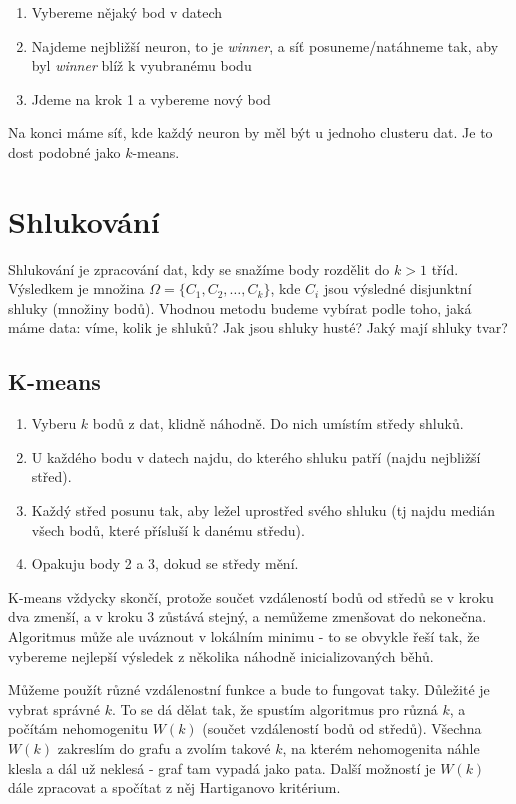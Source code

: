 \documentclass[10pt,a4paper]{article}
\begin{document}
\begin{enumerate}
\item Vybereme nějaký bod v datech
\item Najdeme nejbližší neuron, to je \textit{winner}, a síť posuneme/natáhneme tak, aby byl \textit{winner} blíž k vyubranému bodu
\item Jdeme na krok 1 a vybereme nový bod
\end{enumerate}

\noindent Na konci máme síť, kde každý neuron by měl být u jednoho clusteru dat. Je to dost podobné jako $k$-means.







\section{Shlukování}

Shlukování je zpracování dat, kdy se snažíme body rozdělit do $k>1$ tříd. Výsledkem je množina $\Omega = \{C_1, C_2, \dots, C_k\}$, kde $C_i$ jsou výsledné disjunktní shluky (množiny bodů). Vhodnou metodu budeme vybírat podle toho, jaká máme data: víme, kolik je shluků? Jak jsou shluky husté? Jaký mají shluky tvar?

\subsection{K-means}

\begin{enumerate}
\item Vyberu $k$ bodů z dat, klidně náhodně. Do nich umístím středy shluků.
\item U každého bodu v datech najdu, do kterého shluku patří (najdu nejbližší střed).
\item Každý střed posunu tak, aby ležel uprostřed svého shluku (tj najdu medián všech bodů, které přísluší k danému středu).
\item Opakuju body 2 a 3, dokud se středy mění.
\end{enumerate}

K-means vždycky skončí, protože součet vzdáleností bodů od středů se v kroku dva zmenší, a v kroku 3 zůstává stejný, a nemůžeme zmenšovat do nekonečna. Algoritmus může ale uváznout v lokálním minimu - to se obvykle řeší tak, že vybereme nejlepší výsledek z několika náhodně inicializovaných běhů.

Můžeme použít různé vzdálenostní funkce a bude to fungovat taky. Důležité je vybrat správné $k$. To se dá dělat tak, že spustím algoritmus pro různá $k$, a počítám nehomogenitu $W(k)$ (součet vzdáleností bodů od středů). Všechna $W(k)$ zakreslím do grafu a zvolím takové $k$, na kterém nehomogenita náhle klesla a dál už neklesá - graf tam vypadá jako pata. Další možností je $W(k)$ dále zpracovat a spočítat z něj Hartiganovo kritérium.
\end{document}
